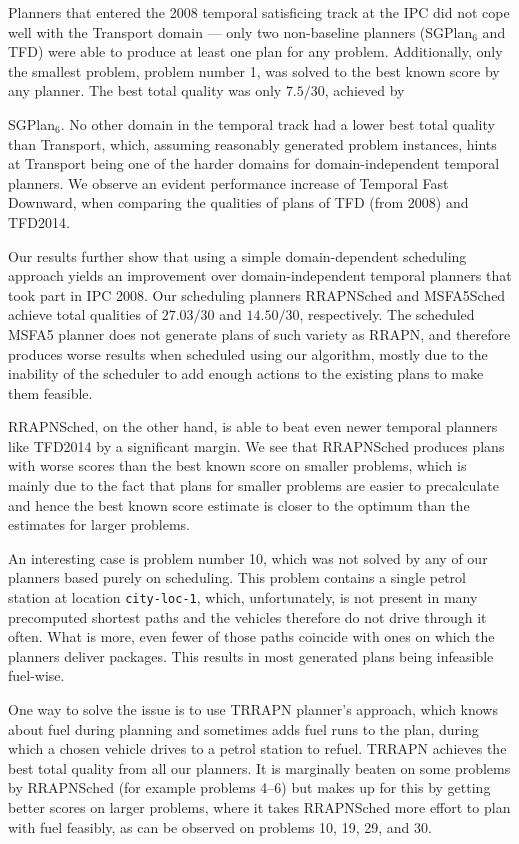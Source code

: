 Planners that entered the 2008 temporal satisficing track at the IPC did not cope well with the Transport domain
--- only two non-baseline planners (SGPlan$_6$ and TFD) were able to produce at least one plan
for any problem. Additionally, only the smallest problem, problem number 1, was solved
to the best known score by any planner.
The best total quality was only $7.5/30$, achieved by
{SGPlan$_6$. No other domain in the temporal track had a lower best total quality
than Transport, which, assuming reasonably generated problem instances, hints
at Transport being one of the harder domains for domain-independent temporal planners.
We observe an evident performance increase of Temporal Fast Downward,
when comparing the qualities of plans of TFD (from 2008) and TFD2014.

Our results further show that using a simple domain-dependent scheduling approach
yields an improvement over domain-independent temporal planners
that took part in IPC 2008. Our scheduling planners RRAPNSched
and MSFA5Sched achieve total qualities of $27.03/30$
and $14.50/30$, respectively.
The scheduled MSFA5 planner does not generate plans of such variety as RRAPN,
and therefore produces worse results when scheduled using our algorithm,
mostly due to the inability of the scheduler to add enough 
actions to the existing plans to make them feasible.

RRAPNSched, on the other hand, is able to beat even newer temporal planners like TFD2014
by a significant margin.
We see that RRAPNSched produces plans with worse scores than the best known score on smaller problems, which is mainly due to the fact that plans for smaller problems are easier to precalculate and hence the best known score estimate is closer
to the optimum than the estimates for larger problems.

An interesting case is problem number 10,
which was not solved by any of our planners based purely on scheduling.
This problem contains a single petrol station at location \texttt{city-loc-1},
which, unfortunately, is not present in many precomputed shortest
paths and the vehicles therefore do not drive through it often.
What is more, even fewer of those paths coincide with ones
on which the planners deliver packages.
This results in most generated plans being infeasible fuel-wise.

One way to solve the issue is to use TRRAPN planner's approach,
which knows about fuel during planning and 
sometimes adds fuel runs to the plan, during which a chosen vehicle
drives to a petrol station to refuel.
TRRAPN achieves the best total quality from all our planners.
It is marginally beaten on some problems by RRAPNSched (for example problems 4--6) but makes up for this by getting better scores on
larger problems, where it takes RRAPNSched more effort to plan with fuel feasibly,
as can be observed on problems 10, 19, 29, and 30.

}
